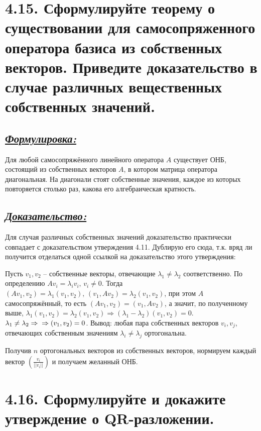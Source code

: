 \documentclass{article}
\begin{document}
\section*{\LARGE 4.15. Сформулируйте теорему о существовании для самосопряженного оператора базиса из собственных векторов. Приведите доказательство в случае различных вещественных собственных значений. }
\subsection*{\Large \underline{\textit{Формулировка: }}}
Для любой самосопряжённого линейного оператора $A$ существует ОНБ, состоящий из собственных векторов $A$, в котором матрица оператора диагональная. На диагонали стоят собственные значения, каждое из которых повторяется столько раз, какова его алгебраическая кратность.

\subsection*{\Large \underline{\textit{Доказательство: }}}
Для случая различных собственных значений доказательство практически совпадает с доказательством утверждения 4.11. Дублирую его сюда, т.к. вряд ли получится отделаться одной ссылкой на доказательство этого утверждения:

Пусть $v_1, v_2$ -- собственные векторы, отвечающие $\lambda_1 \ne \lambda_2$ соответственно. По определению $Av_i = \lambda_iv_i,\, v_i \ne 0$. Тогда $(Av_1, v_2) = \lambda_1(v_1, v_2),\, (v_1, Av_2) = \lambda_2(v_1, v_2)$, при этом $A$ самосопряжённый, то есть $(Av_1, v_2) = (v_1, Av_2)$, а значит, по полученному выше, $\lambda_1(v_1, v_2) = \lambda_2(v_1, v_2) \Rightarrow (\lambda_1 - \lambda_2)(v_1, v_2) = 0$. $\lambda_1 \ne \lambda_2 \Rightarrow \newline \Rightarrow (v_1, v_2) = 0$. Вывод: любая пара собственных векторов $v_i, v_j$, отвечающих собственным значениям $\lambda_i \ne \lambda_j$ ортогональна.

Получив $n$ ортогональных векторов из собственных векторов, нормируем каждый вектор $(\frac{v_i}{||v_i||})$ и получаем желанный ОНБ.

\section*{\LARGE 4.16. Сформулируйте и докажите утверждение о QR-разложении. }
\end{document}
